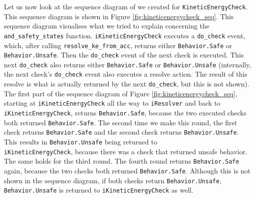 \documentclass[12pt]{scrreprt}
\begin{document}
Let us now look at the sequence diagram of we created for \texttt{KineticEnergyCheck}. This sequence diagram is shown in Figure \ref{fig:kineticenergycheck_seq}. This sequence diagram visualises what we tried to explain concerning the \texttt{and\_safety\_states} function. \texttt{iKineticEnergyCheck} executes a \texttt{do\_check} event, which, after calling \texttt{resolve\_ke\_from\_acc}, returns either \texttt{Behavior.Safe} or \texttt{Behavior.Unsafe}. Then the \texttt{do\_check} event of the next check is executed. This next \texttt{do\_check} also returns either \texttt{Behavior.Safe} or \texttt{Behavior.Unsafe} (internally, the next check's \texttt{do\_check} event also executes a resolve action. The result of this resolve is what is actually returned by the next \texttt{do\_check}, but this is not shown). The first part of the sequence diagram of Figure \ref{fig:kineticenergycheck_seq}, starting at \texttt{iKineticEnergyCheck} all the way to \texttt{iResolver} and back to \texttt{iKineticEnergyCheck}, returns \texttt{Behavior.Safe}, because the two executed checks both returned \texttt{Behavior.Safe}. The second time we make this round, the first check returns \texttt{Behavior.Safe} and the second check returns \texttt{Behavior.Unsafe}. This results in \texttt{Behavior.Unsafe} being returned to\\\texttt{iKineticEnergyCheck}, because there was a check that returned unsafe behavior. The same holds for the third round. The fourth round returns \texttt{Behavior.Safe} again, because the two checks both returned \texttt{Behavior.Safe}. Although this is not shown in the sequence diagram, if both checks return \texttt{Behavior.Unsafe}, \texttt{Behavior.Unsafe} is returned to \texttt{iKineticEnergyCheck} as well.
\end{document}
